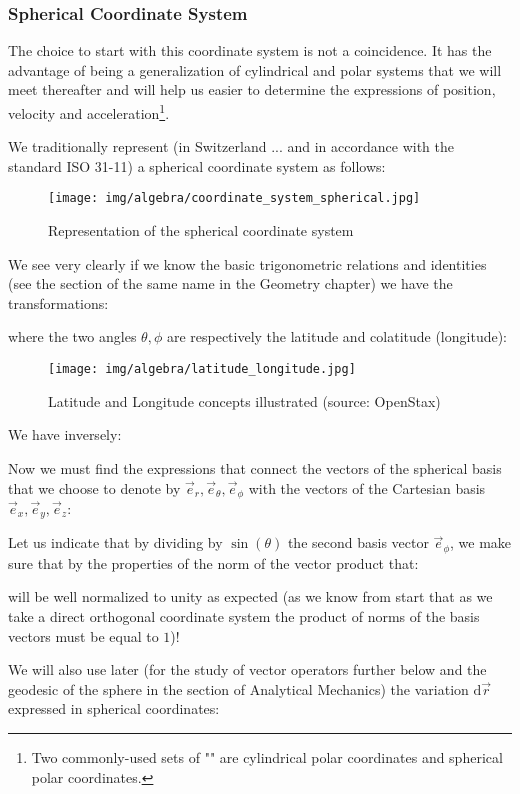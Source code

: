 	\pagebreak
	\subsubsection{Spherical Coordinate System}\label{spherical coordinates}
	The choice to start with this coordinate system is not a coincidence. It has the advantage of being a generalization of cylindrical and polar systems that we will meet thereafter and will help us easier to determine the expressions of position, velocity and acceleration\footnote{Two commonly-used sets of "" are cylindrical polar coordinates and spherical polar coordinates.}\label{orthogonal curvilinear coordinates}.
	
	We traditionally represent (in Switzerland ... and in accordance with the standard ISO 31-11) a spherical coordinate system as follows:
	\begin{figure}[H]
		\centering
		\texttt{[image: img/algebra/coordinate\_system\_spherical.jpg]}
		\caption{Representation of the spherical coordinate system}
	\end{figure}
	We see very clearly if we know the basic trigonometric relations and identities (see the section of the same name in the Geometry chapter) we have the transformations:
	
	
	where the two angles $\theta, \phi$ are respectively the latitude and colatitude (longitude):
	\begin{figure}[H]
		\centering
		\texttt{[image: img/algebra/latitude\_longitude.jpg]}
		\caption[Latitude and Longitude concepts illustrated]{Latitude and Longitude concepts illustrated (source: OpenStax)}
	\end{figure}
	We have inversely:
	
	Now we must find the expressions that connect the vectors of the spherical basis that we choose to denote by $\vec{e}_r,\vec{e}_\theta,\vec{e}_\phi$ with the vectors of the Cartesian basis $\vec{e}_x,\vec{e}_y,\vec{e}_z$:
	
	Let us indicate that by dividing by $\sin(\theta)$ the second basis vector $\vec{e}_\phi$, we make sure that by the properties of the norm of the vector product that:
	
	will be well normalized to unity as expected (as we know from start that as we take a direct orthogonal coordinate system the product of norms of the basis vectors must be equal to $1$)!
	
	We will also use later (for the study of vector operators further below and the geodesic of the sphere in the section of Analytical Mechanics) the variation $\mathrm{d}\vec{r}$ expressed in spherical coordinates:
	
